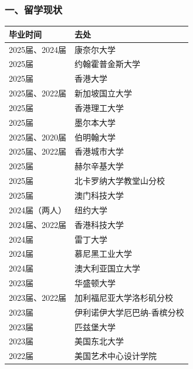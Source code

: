 \subsubsection{一、留学现状}
\SourceBlankLine[1]
\begin{center}
\small
\setlength{\tabcolsep}{2.5pt}
\renewcommand{\arraystretch}{1.22}
\begin{longtable}{|>{\RaggedRight\arraybackslash}p{}|>{\RaggedRight\arraybackslash}p{}|}
\hline
毕业时间 & 去处 \\
\hline
2025届、2024届 & 康奈尔大学 \\
\hline
2025届 & 约翰霍普金斯大学 \\
\hline
2025届 & 香港大学 \\
\hline
2025届、2022届 & 新加坡国立大学 \\
\hline
2025届 & 香港理工大学 \\
\hline
2025届 & 墨尔本大学 \\
\hline
2025届、2020届 & 伯明翰大学 \\
\hline
2025届、2022届 & 香港城市大学 \\
\hline
2025届 & 赫尔辛基大学 \\
\hline
2025届 & 北卡罗纳大学教堂山分校 \\
\hline
2025届 & 澳门科技大学 \\
\hline
2024届（两人） & 纽约大学 \\
\hline
2024届、2022届 & 香港科技大学 \\
\hline
2024届 & 雷丁大学 \\
\hline
2024届 & 慕尼黑工业大学 \\
\hline
2024届 & 澳大利亚国立大学 \\
\hline
2023届 & 华盛顿大学 \\
\hline
2023届、2022届 & 加利福尼亚大学洛杉矶分校 \\
\hline
2023届 & 伊利诺伊大学厄巴纳-香槟分校 \\
\hline
2023届 & 匹兹堡大学 \\
\hline
2023届 & 美国东北大学 \\
\hline
2022届 & 美国艺术中心设计学院 \\
\hline
\end{longtable}
\end{center}
\SourceBlankLine[1]
